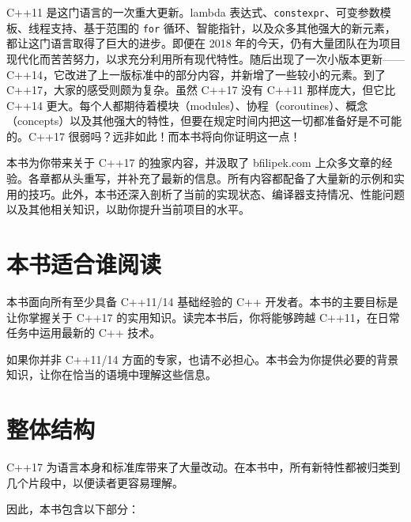 C++11 是这门语言的一次重大更新。lambda 表达式、\texttt{constexpr}、可变参数模板、线程支持、基于范围的 \texttt{for} 循环、智能指针，以及众多其他强大的新元素，都让这门语言取得了巨大的进步。即便在 2018 年的今天，仍有大量团队在为项目现代化而苦苦努力，以求充分利用所有现代特性。随后出现了一次小版本更新——C++14，它改进了上一版标准中的部分内容，并新增了一些较小的元素。到了 C++17，大家的感受则颇为复杂。虽然 C++17 没有 C++11 那样庞大，但它比 C++14 更大。每个人都期待着模块（modules）、协程（coroutines）、概念（concepts）以及其他强大的特性，但要在规定时间内把这一切都准备好是不可能的。C++17 很弱吗？远非如此！而本书将向你证明这一点！

本书为你带来关于 C++17 的独家内容，并汲取了 bfilipek.com 上众多文章的经验。各章都从头重写，并补充了最新的信息。所有内容都配备了大量新的示例和实用的技巧。此外，本书还深入剖析了当前的实现状态、编译器支持情况、性能问题以及其他相关知识，以助你提升当前项目的水平。

\section{本书适合谁阅读}

本书面向所有至少具备 C++11/14 基础经验的 C++ 开发者。本书的主要目标是让你掌握关于 C++17 的实用知识。读完本书后，你将能够跨越 C++11，在日常任务中运用最新的 C++ 技术。

如果你并非 C++11/14 方面的专家，也请不必担心。本书会为你提供必要的背景知识，让你在恰当的语境中理解这些信息。

\section{整体结构}

C++17 为语言本身和标准库带来了大量改动。在本书中，所有新特性都被归类到几个片段中，以便读者更容易理解。

因此，本书包含以下部分：

